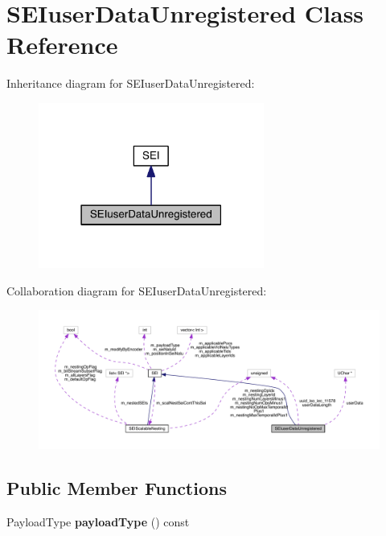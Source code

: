 \hypertarget{class_s_e_iuser_data_unregistered}{}\section{S\+E\+Iuser\+Data\+Unregistered Class Reference}
\label{class_s_e_iuser_data_unregistered}


Inheritance diagram for S\+E\+Iuser\+Data\+Unregistered\+:
\nopagebreak
\begin{figure}[H]
\begin{center}
\leavevmode
\includegraphics[width=210pt]{d2/d9c/class_s_e_iuser_data_unregistered__inherit__graph}
\end{center}
\end{figure}


Collaboration diagram for S\+E\+Iuser\+Data\+Unregistered\+:
\nopagebreak
\begin{figure}[H]
\begin{center}
\leavevmode
\includegraphics[width=350pt]{d9/d70/class_s_e_iuser_data_unregistered__coll__graph}
\end{center}
\end{figure}
\subsection*{Public Member Functions}
\begin{DoxyCompactItemize}
\item 
\mbox{\label{class_s_e_iuser_data_unregistered_af7da374455ad834fe9bd08317a76fd2e}} 
Payload\+Type {\bfseries payload\+Type} () const
\end{DoxyCompactItemize}

